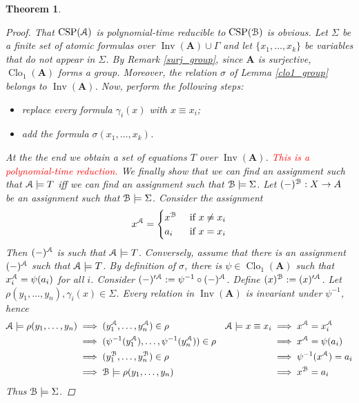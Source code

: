 \documentclass{amsart}
\theoremstyle{plain}
\newtheorem{theorem}{Theorem}[section]
\theoremstyle{definition}
\theoremstyle{remark}
\DeclareMathOperator{\Clo}{Clo}
\DeclareMathOperator{\CSP}{CSP}
\DeclareMathOperator{\Inv}{Inv}
\begin{document}
\begin{theorem}
\begin{proof}
    That $\CSP(\EuScript{A})$ is polynomial-time reducible to $\CSP(\EuScript{B})$ is obvious.
    Let $\Sigma$ be a finite set of atomic formulas over $\Inv(\mathbf{A}) \cup \Gamma$ and let $\{x_1, \ldots, x_k\}$ be variables that do not appear in $\Sigma$. 
    By Remark \ref{surj_group}, since $\mathbf{A}$ is surjective, $\Clo_1(\mathbf{A})$ forms a group. 
    Moreover, the relation $\sigma$ of Lemma \ref{clo1_group} belongs to $\Inv(\mathbf{A})$. 
    Now, perform the following steps: 
        \begin{itemize}
            \item replace every formula $\gamma_i(x)$ with $x \equiv x_i$; 
            \item add the formula $\sigma(x_1, \ldots, x_k)$. 
        \end{itemize}
    At the the end we obtain a set of equations $T$ over $\Inv(\mathbf{A})$. 
    \textcolor{red}{This is a polynomial-time reduction.}
    We finally show that we can find an assignment such that $\EuScript{A} \models T$ iff we can find an assignment such that $\EuScript{B} \models \Sigma$.
    Let $(-)^{\EuScript{B}}: X \to A$ be an assignment such that $\EuScript{B} \models \Sigma$. 
    Consider the assignment 
    \begin{equation*}
        x^{\EuScript{A}} = 
        \begin{cases}
            x^{\EuScript{B}} & \text{ if } x \neq x_i \\
            a_i & \text{ if } x = x_i 
        \end{cases}
    \end{equation*}
    Then $(-)^\EuScript{A}$ is such that $\EuScript{A} \models T$.  
    Conversely, assume that there is an assignment $(-)^{\EuScript{A}}$ such that $\EuScript{A} \models T$. 
    By definition of $\sigma$, there is $\psi \in \Clo_1(\mathbf{A})$ such that $x_i^{\EuScript{A}} = \psi(a_i)$ for all $i$. 
    Consider $(-)'^{\EuScript{A}}:=\psi^{-1}\circ(-)^{\EuScript{A}}$. 
    Define $(x)^{\EuScript{B}}:=(x)'^{\EuScript{A}}$.
    Let $\rho(y_1, \ldots, y_n), \gamma_i(x) \in \Sigma$. 
    Every relation in $\Inv(\mathbf{A})$ is invariant under $\psi^{-1}$, hence  
    \begin{alignat*}{2}
        \EuScript{A} \models \rho(y_1, \ldots, y_n) & \implies (y_1^{\EuScript{A}}, \ldots, y_n^{\EuScript{A}}) \in \rho  & \EuScript{A} \models x \equiv x_i &  \implies x^{\EuScript{A}} = x_i^{\EuScript{A}}  \\
        & \implies (\psi^{-1}(y_1^{\EuScript{A}}), \ldots, \psi^{-1}(y_n^{\EuScript{A}})) \in \rho  &   & \implies x^{\EuScript{A}}=\psi(a_i) \\
        & \implies (y_1^{\EuScript{B}}, \ldots, y_n^{\EuScript{B}}) \in \rho  &   & \implies \psi^{-1}(x^{\EuScript{A}}) = a_i   \\
        & \implies \EuScript{B} \models \rho(y_1, \ldots, y_n)  &    & \implies x^{\EuScript{B}}= a_i  
    \end{alignat*}
    Thus $\EuScript{B} \models \Sigma$. 
\end{proof}
\end{theorem}
\end{document}

